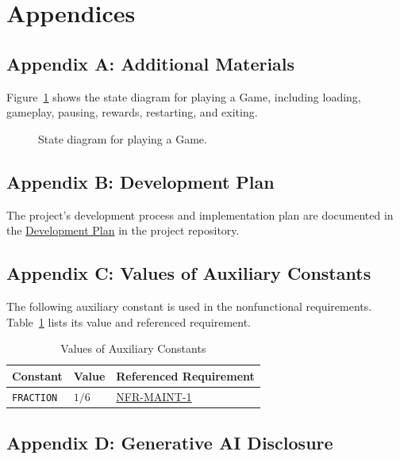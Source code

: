 \documentclass[12pt]{article}
\begin{document}
\newpage{}

\section{Appendices}

\subsection{Appendix A: Additional Materials}

Figure~\ref{fig:PlayingGame} shows the state diagram for playing a Game,
including loading, gameplay, pausing, rewards, restarting, and exiting.

\begin{figure}[htbp]
  \centering
  \resizebox{0.95\textwidth}{!}{}
  \caption{State diagram for playing a Game.}
  \label{fig:PlayingGame}
\end{figure}

\subsection{Appendix B: Development Plan}

The project's development process and implementation plan are documented in the
\href{https://github.com/meena-alomran/game-n-grow/blob/main/pdfs/DevelopmentPlan/DevelopmentPlan.pdf}{Development Plan}
in the project repository.

\subsection{Appendix C: Values of Auxiliary Constants}
\label{Appendix C}

The following auxiliary constant is used in the nonfunctional requirements.
Table~\ref{tab:AuxiliaryConstants} lists its value and referenced requirement.

\begin{table}[htbp]
\centering
\begin{tabular}{lll}
\toprule
Constant & Value & Referenced Requirement \\
\midrule
\texttt{FRACTION} & $1/6$ &
\hyperref[NFR-MAINT-1]{NFR-MAINT-1} \\
\bottomrule
\end{tabular}
\caption{Values of Auxiliary Constants}
\label{tab:AuxiliaryConstants}
\end{table}

\subsection{Appendix D: Generative AI Disclosure}
\end{document}
